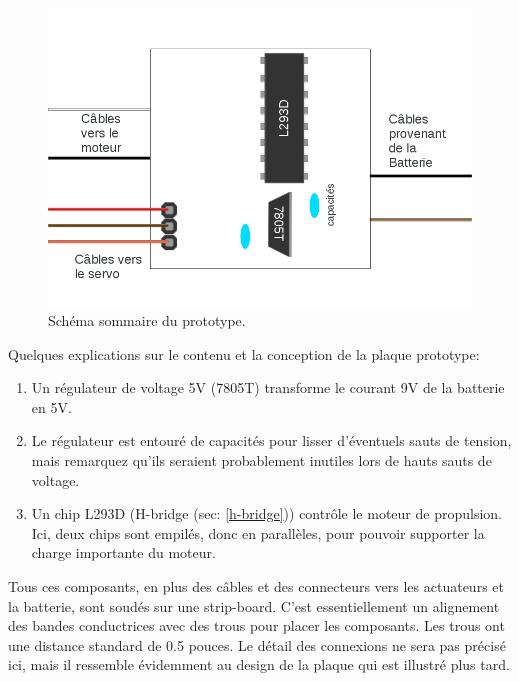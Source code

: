 \documentclass[a4paper,11pt]{report}
\begin{document}
{\begin{figure}[h]
\centering
\includegraphics[width=1.0\textwidth]{SchemaPlaqueMaison}
    \caption{\label{SchemaPlaqueMaison}Schéma sommaire du prototype.
    }
\end{figure}

Quelques explications sur le contenu et la conception de la plaque prototype:

\begin{enumerate}
	\item Un régulateur de voltage 5V (7805T) transforme le courant 9V de
          la batterie en 5V. 

	\item Le régulateur est entouré de capacités pour lisser d'éventuels
          sauts de tension, mais remarquez qu'ils seraient probablement
          inutiles lors de hauts sauts de voltage. 

	\item Un chip L293D (H-bridge (sec: \ref{h-bridge})) contrôle le
          moteur de propulsion. Ici, deux chips sont empilés, donc en
          parallèles, pour pouvoir supporter la charge importante du moteur. 
\end{enumerate}

Tous ces composants, en plus des câbles et des connecteurs vers les actuateurs
et la batterie, sont soudés sur une strip-board. C'est essentiellement un alignement des bandes conductrices avec des trous pour placer les
composants. Les trous ont une distance standard de 0.5 pouces. Le détail des
connexions ne sera pas précisé ici, mais il ressemble évidemment 
au design de la plaque qui est illustré plus tard.   

}
\end{document}
